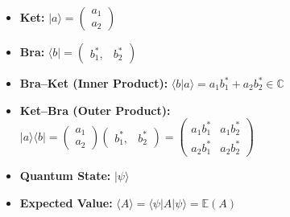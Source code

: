 \begin{itemize}
    \item \textbf{Ket:} \(|a\rangle = \begin{pmatrix} a_1 \\ a_2 \end{pmatrix}\)
    \\

    \item \textbf{Bra:} \(\langle b| = \begin{pmatrix} b_1^*, & b_2^* \end{pmatrix}\)
    \\
    
    \item \textbf{Bra–Ket (Inner Product):} \(\langle b | a \rangle = a_1 b_1^* + a_2 b_2^* \in \mathbb{C}\)
    \\

    \item \textbf{Ket–Bra (Outer Product):}
    \(|a\rangle \langle b| = 
    \begin{pmatrix} a_1 \\ a_2 \end{pmatrix}
    \begin{pmatrix} b_1^*, & b_2^* \end{pmatrix}
    =
    \begin{pmatrix}
    a_1 b_1^* & a_1 b_2^* \\
    a_2 b_1^* & a_2 b_2^*
    \end{pmatrix}\)
    \\

    \item \textbf{Quantum State:} 
    \(|\psi\rangle\)
    \\

    \item \textbf{Expected Value:}
    \( \langle A\rangle = \langle \psi | A| \psi \rangle = \mathbb{E}(A)\)
\end{itemize}




